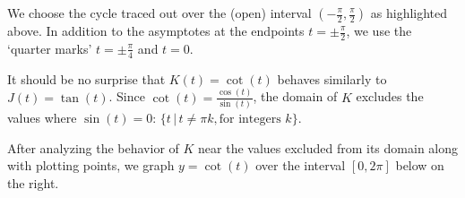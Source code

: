 \smallskip

We choose the cycle traced out  over the (open) interval $\left( -\frac{\pi}{2}, \frac{\pi}{2} \right)$ as highlighted above.  In addition to the asymptotes at the endpoints $t = \pm \frac{\pi}{2}$, we use the `quarter marks' $t = \pm \frac{\pi}{4}$ and $t = 0$. 

\smallskip

It should be no surprise that $K(t) = \cot(t)$ behaves similarly to $J(t)=\tan(t)$.  Since $\cot(t) = \frac{\cos(t)}{\sin(t)}$, the domain of $K$ excludes the values where $\sin(t) = 0$:   $\{ t \, | \, t \neq  \pi k, \text{for integers $k$} \}$.

\smallskip

After analyzing the behavior of $K$ near the values excluded from its domain  along with plotting points, we graph $y = \cot(t)$ over the interval $[0,2\pi]$ below on the right. 

